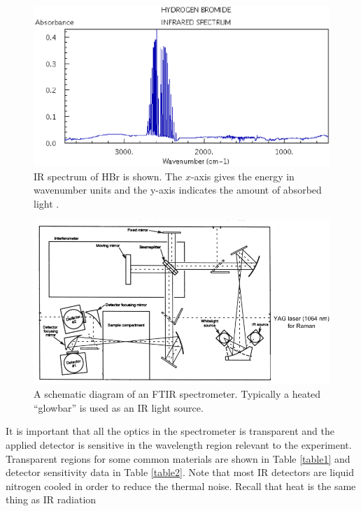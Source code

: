 \documentclass[byrevtex,amssymb,aps,pra,floatfix,letterpaper]{revtex4}
\begin{document}
\begin{figure}[!htp]
\begin{center}
\includegraphics[scale=0.4]{fig3}
\caption{IR spectrum of HBr is shown. The $x$-axis gives the energy in wavenumber units and the y-axis indicates the amount of absorbed light \cite{webbook}.}
\label{fig3}
\end{center}
\end{figure}

\begin{figure}[!htp]
\begin{center}
\includegraphics[scale=0.4]{fig4}
\caption{A schematic diagram of an FTIR spectrometer. Typically a heated ``glowbar'' is used as an IR light source.}
\label{fig4}
\end{center}
\end{figure}

\noindent
It is important that all the optics in the spectrometer is transparent and the applied detector is sensitive in the wavelength region relevant to the experiment. Transparent regions for some common materials are shown in Table \ref{table1} and detector sensitivity data in Table \ref{table2}. Note that most IR detectors are liquid nitrogen cooled in order to reduce the thermal noise. Recall that heat is the same thing as IR radiation
\end{document}
